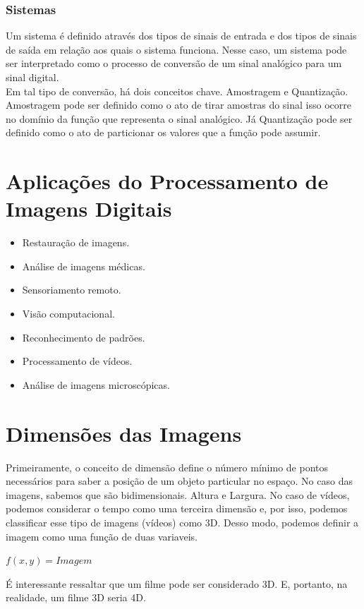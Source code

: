 \documentclass[a4paper, 12pt]{article}
\begin{document}
\subsubsection{Sistemas}
Um sistema é definido através dos tipos de sinais de entrada e dos tipos de sinais de saída
em relação aos quais o sistema funciona. Nesse caso, um sistema pode ser interpretado como o processo
de conversão de um sinal analógico para um sinal digital.
\\

Em tal tipo de conversão, há dois conceitos chave. Amostragem e Quantização.
Amostragem pode ser definido como o ato de tirar amostras do sinal isso ocorre no domínio da função que representa o sinal analógico.
Já Quantização pode ser definido como o ato de particionar os valores que a função pode assumir.


\section{Aplicações do Processamento de Imagens Digitais}
\begin{itemize}
	\item Restauração de imagens.
	\item Análise de imagens médicas.
  	\item Sensoriamento remoto.
   	\item Visão computacional.
    \item Reconhecimento de padrões.
    \item Processamento de vídeos.
    \item Análise de imagens microscópicas.
\end{itemize}

\section{Dimensões das Imagens}
Primeiramente, o conceito de dimensão define o número mínimo de pontos necessários para saber a posição de um objeto particular 
no espaço. No caso das imagens, sabemos que são bidimensionais. Altura e Largura. No caso de vídeos, podemos considerar o tempo como
 uma terceira dimensão e, por isso, podemos classificar esse tipo de imagens (vídeos) como 3D. Desso modo, podemos definir a imagem como
 uma função de duas variaveis.
 \begin{center}
	$f(x,y) = Imagem$
 \end{center}

 É interessante ressaltar que um filme pode ser considerado 3D. E, portanto, na realidade, um filme 3D seria 4D.
\end{document}
